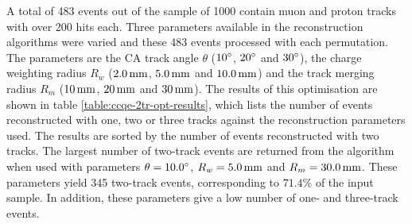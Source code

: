 A total of 483 events out of the sample of 1000 contain muon and proton tracks with over 200 hits each. Three parameters available in the reconstruction algorithms were varied and these 483 events processed with each permutation. The parameters are the \ac{CA} track angle $\theta$ ($10^\circ$, $20^\circ$ and $30^\circ$), the charge weighting radius $R_{w}$ ($2.0\,\mathrm{mm}$, $5.0\,\mathrm{mm}$ and $10.0\,\mathrm{mm}$) and the track merging radius $R_m$ ($10\,\mathrm{mm}$, $20\,\mathrm{mm}$ and $30\,\mathrm{mm}$). The results of this optimisation are shown in table \ref{table:ccqe-2tr-opt-results}, which lists the number of events reconstructed with one, two or three tracks against the reconstruction parameters used. The results are sorted by the number of events reconstructed with two tracks. The largest number of two-track events are returned from the algorithm when used with parameters $\theta=10.0^\circ$, $R_w=5.0\,\mathrm{mm}$ and $R_m=30.0\,\mathrm{mm}$. These parameters yield 345 two-track events, corresponding to $71.4\%$ of the input sample. In addition, these parameters give a low number of one- and three-track events.

